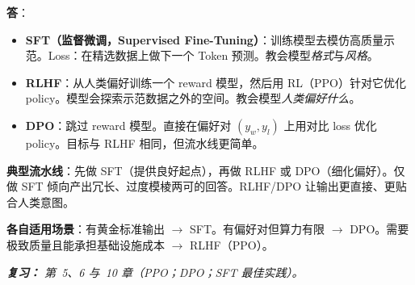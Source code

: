 \begin{questionbox}
\textbf{答}：

\begin{itemize}
  \item \textbf{SFT（监督微调，Supervised Fine-Tuning）}：训练模型去模仿高质量示范。Loss：在精选数据上做下一个 Token 预测。教会模型\emph{格式}与\emph{风格}。
  \item \textbf{RLHF}：从人类偏好训练一个 reward 模型，然后用 RL（PPO）针对它优化 policy。模型会探索示范数据之外的空间。教会模型\emph{人类偏好什么}。
  \item \textbf{DPO}：跳过 reward 模型。直接在偏好对 $(y_w, y_l)$ 上用对比 loss 优化 policy。目标与 RLHF 相同，但流水线更简单。
\end{itemize}

\textbf{典型流水线}：先做 SFT（提供良好起点），再做 RLHF 或 DPO（细化偏好）。仅做 SFT 倾向产出冗长、过度模棱两可的回答。RLHF/DPO 让输出更直接、更贴合人类意图。

\textbf{各自适用场景}：有黄金标准输出 $\rightarrow$ SFT。有偏好对但算力有限 $\rightarrow$ DPO。需要极致质量且能承担基础设施成本 $\rightarrow$ RLHF（PPO）。

\emph{\textbf{复习：} 第~5、6 与~10 章（PPO；DPO；SFT 最佳实践）。}
\end{questionbox}


